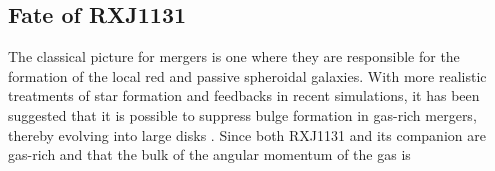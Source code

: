 \documentclass[]{emulateapj}
\begin{document}
\subsection{Fate of RXJ1131}
The classical picture for mergers is one where they are responsible for the formation of the local 
red and passive spheroidal galaxies.
With more realistic treatments of star formation and feedbacks in recent simulations,
it has been suggested that it is possible  to suppress bulge formation 
in gas-rich mergers, thereby evolving into large 
disks \citep{Springel05a, Robertson06a, Hopkins09a}.
%
%
Since both RXJ1131 and its companion are gas-rich
and that the bulk of the angular momentum of the gas is  
\end{document}
